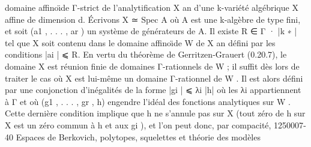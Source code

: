 \documentclass[
  10pt,
]{article}
\newenvironment{Shaded}{}{}
\newcommand{\NormalTok}[1]{#1}
\begin{document}
\begin{Shaded}
\begin{Highlighting}[]
\NormalTok{domaine aﬃnoı̈de Γ{-}strict de l’analytiﬁcation X an d’une k{-}variété algébrique X}
\NormalTok{aﬃne de dimension d.}
\NormalTok{     Écrivons X ≃ Spec A où A est une k{-}algèbre de type ﬁni, et soit (a1 , . . . , ar )}
\NormalTok{un système de générateurs de A. Il existe R ∈ Γ · |k ∗ | tel que X soit contenu}
\NormalTok{dans le domaine aﬃnoı̈de W de X an déﬁni par les conditions |ai | ⩽ R. En vertu}
\NormalTok{du théorème de Gerritzen{-}Grauert (0.20.7), le domaine X est réunion ﬁnie de}
\NormalTok{domaines Γ{-}rationnels de W ; il suﬃt dès lors de traiter le cas où X est lui{-}même}
\NormalTok{un domaine Γ{-}rationnel de W .}
\NormalTok{     Il est alors déﬁni par une conjonction d’inégalités de la forme |gi | ⩽ λi |h| où les λi}
\NormalTok{appartiennent à Γ et où (g1 , . . . , gr , h) engendre l’idéal des fonctions analytiques}
\NormalTok{sur W . Cette dernière condition implique que h ne s’annule pas sur X (tout zéro}
\NormalTok{de h sur X est un zéro commun à h et aux gi ), et l’on peut donc, par compacité,}
\NormalTok{                                            1250007{-}40}
\NormalTok{                            Espaces de Berkovich, polytopes, squelettes et théorie des modèles}



\end{Highlighting}
\end{Shaded}
\end{document}
